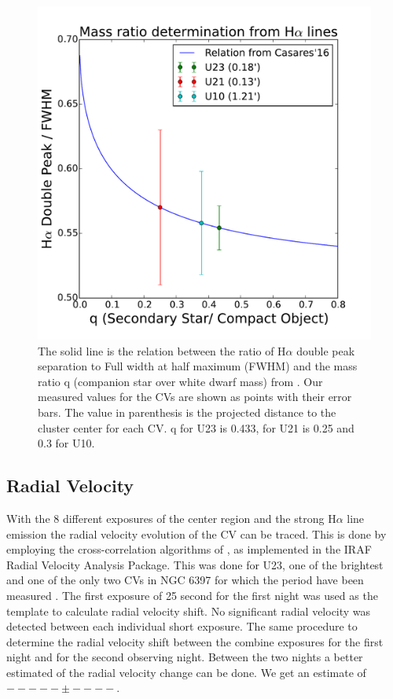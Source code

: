 \begin{figure}[h]
        \centering
        \includegraphics[scale=.5]{assets/images/mass.pdf}
\caption{The solid line is the relation between the ratio of H$\alpha$ double peak separation to Full width at half maximum (FWHM) and the mass ratio q (companion star over white dwarf mass) from \cite{casares_massration_20016}. Our measured values for the CVs are shown as points with their error bars. The value in parenthesis is the projected distance to the cluster center for each CV. q for U23 is 0.433, for U21 is 0.25 and 0.3 for U10.}
\label{fig:mass}
\end{figure}

\subsection{Radial Velocity}

With the 8 different exposures of the center region and the strong H$\alpha$ line emission the radial velocity evolution of the CV can be traced. This is done by employing the cross-correlation algorithms of \cite{tonry_cross_1979}, as implemented in the IRAF Radial Velocity Analysis Package. This was done for U23, one of the brightest and one of the only two CVs in NGC 6397 for which the period have been measured \citep{kaluzny_time_2003}. The first exposure of 25 second for the first night was used as the template to calculate radial velocity shift. No significant radial velocity was detected between each individual short exposure.  The same procedure to determine the radial velocity shift between the combine exposures for the first night and for the second observing night. Between the two nights a better estimated of the radial velocity change can be done. We get an estimate of $----- \pm ----$.  


